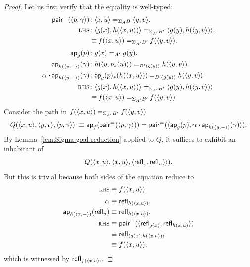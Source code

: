 \begin{proof}
    Let us first verify that the equality is well-typed:
    \begin{align*}
        \fun{pair}^{\eq{}}(\dep{p,\gamma})
            &\colon\dep{x,u}\eq{\Sigma_AB}\dep{y,v}.\\
        \lhs
            &\colon\dep{g(x),h(\dep{x,u})}
                \eq{\Sigma_{A'}B'}
                \dep{g(y),h(\dep{y,v})}.\\
            &\equiv f(\dep{x,u})\eq{\Sigma_{A'}B'}f(\dep{y,v}).\\[1mm]
        \fun{ap}_g(p)
            &\colon g(x)\eq{A'}g(y).\\
        \fun{ap}_{h(\dep{y,\dummy})}(\gamma)
            &\colon h(\dep{y,p_*(u)})\eq{B'(g(y))}h(\dep{y,v}).\\
        \alpha\ct\fun{ap}_{h(\dep{y,\dummy})}(\gamma)
            &\colon\fun{ap}_g(p)_*(h(\dep{x,u}))
                \eq{B'(g(y))}
                h(\dep{y,v}).\\
        \rhs
            &\colon\dep{g(x),h(\dep{x,u})}
                \eq{\Sigma_{A'}B'}
                \dep{g(y),h(\dep{y,v})}\\
            &\equiv f(\dep{x,u})\eq{\Sigma_{A'}B'}f(\dep{y,v}).
    \end{align*}
    Consider the path in $f(\langle x,u\rangle)\mathrel{=_{\Sigma_{A'}B'}}f(\langle y,v\rangle)$
    \begin{align*}
        Q(\langle x,u\rangle,\langle y,v\rangle,\langle p,\gamma\rangle)
        \mathrel{\vcentcolon}\equiv
        \mathsf{ap}_f(\mathsf{pair}^{\mathrel{=_{}}}(\langle p,\gamma\rangle))
        \mathrel{=_{}}
        \mathsf{pair}^{\mathrel{=_{}}}
            (
            \langle\mathsf{ap}_g(p),
            \alpha\mathbin{\boldsymbol{\cdot}}\mathsf{ap}_{h(\langle y,{\mathord-}\rangle)}(\gamma)\rangle
            ).
    \end{align*}
    By Lemma~\ref{lem:Sigma-goal-reduction} applied to $Q$,
    it suffices to exhibit an inhabitant of
    \[
        Q(
            \langle x,u\rangle,
            \langle x,u\rangle,
            \langle\mathsf{refl}_x,\mathsf{refl}_u)\rangle
        ).
    \]
    But this is trivial because both sides of the equation reduce to
    \begin{align*}
        \textsc{lhs}&\equiv f(\langle x,u\rangle).\\[1mm]
        \alpha&\equiv\mathsf{refl}_{h(\langle x,u\rangle)}.\\
        \mathsf{ap}_{h(\langle x,{\mathord-}\rangle)}(\mathsf{refl}_u)
            &\equiv\mathsf{refl}_{h(\langle x,u\rangle)}.\\
        \textsc{rhs}&\equiv\mathsf{pair}^{\mathrel{=_{}}}
                (\langle
                    \mathsf{refl}_{g(x)},
                    \mathsf{refl}_{h(x,u)}
                \rangle)\\
            &\equiv\mathsf{refl}_{\langle g(x),h(\langle x,u\rangle)\rangle}\\
            &\equiv f(\langle x,u\rangle),
    \end{align*}
    which is witnessed by $\mathsf{refl}_{f(\langle x,u\rangle)}$.
\end{proof}

